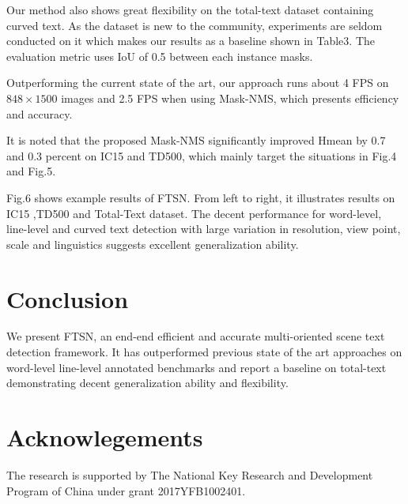 \documentclass[a4paper,conference]{IEEEtran}
\begin{document}
Our method also shows great flexibility on the total-text dataset containing curved text. As the dataset is new to the community, experiments are seldom conducted on it which makes our results as a baseline shown in Table3. The evaluation metric uses IoU of 0.5 between each instance masks. 

Outperforming the current state of the art, our approach runs about 4 FPS on \begin{math}848\times1500\end{math} images and 2.5 FPS when using Mask-NMS, which presents efficiency and accuracy.

It is noted that the proposed Mask-NMS significantly improved Hmean by 0.7 and 0.3 percent on IC15 and TD500, which mainly target the situations in Fig.4 and Fig.5. 

Fig.6 shows example results of FTSN. From left to right, it illustrates results on IC15 ,TD500 and Total-Text dataset. The decent performance for word-level, line-level and curved text detection with large variation in resolution, view point, scale and linguistics suggests excellent generalization ability.

\section{Conclusion}
We present FTSN, an end-end efficient and accurate multi-oriented scene text detection framework. It has outperformed previous state of the art approaches on word-level line-level annotated benchmarks and report a baseline on total-text demonstrating decent generalization ability and flexibility. 

\section{Acknowlegements}
The research is supported by The National Key Research and Development Program of China under grant 2017YFB1002401.




\end{document}
